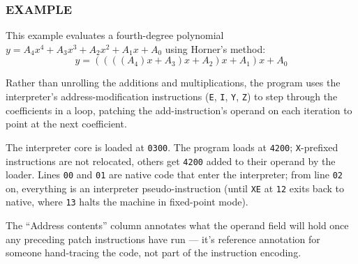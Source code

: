 \subsubsection*{EXAMPLE}

This example evaluates a fourth-degree polynomial $y = A_4 x^4 + A_3 x^3 + A_2 x^2 + A_1 x + A_0$ using Horner's method:
\[ y = ((((A_4) x + A_3) x + A_2) x + A_1) x + A_0 \]

Rather than unrolling the additions and multiplications, the program uses the interpreter's address-modification instructions (\texttt{E}, \texttt{I}, \texttt{Y}, \texttt{Z}) to step through the coefficients in a loop, patching the add-instruction's operand on each iteration to point at the next coefficient.

The interpreter core is loaded at \texttt{0300}. The program loads at \texttt{4200}; \texttt{X}-prefixed instructions are not relocated, others get \texttt{4200} added to their operand by the loader. Lines \texttt{00} and \texttt{01} are native code that enter the interpreter; from line \texttt{02} on, everything is an interpreter pseudo-instruction (until \texttt{XE} at \texttt{12} exits back to native, where \texttt{13} halts the machine in fixed-point mode).

The ``Address contents'' column annotates what the operand field will hold once any preceding patch instructions have run --- it's reference annotation for someone hand-tracing the code, not part of the instruction encoding.

